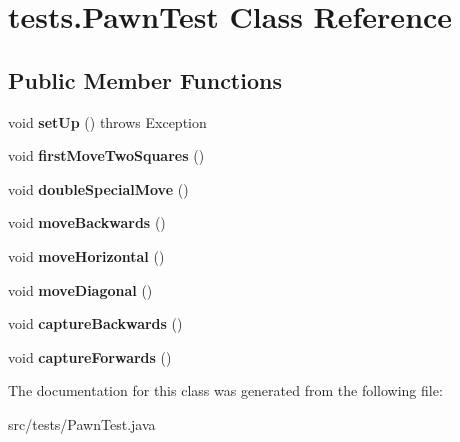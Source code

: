 \hypertarget{classtests_1_1_pawn_test}{\section{tests.\-Pawn\-Test Class Reference}
\label{classtests_1_1_pawn_test}
}
\subsection*{Public Member Functions}
\begin{DoxyCompactItemize}
\item 
\hypertarget{classtests_1_1_pawn_test_a1c95ca15c50c6d846a5ca577defdb7ab}{void {\bfseries set\-Up} ()  throws Exception }\label{classtests_1_1_pawn_test_a1c95ca15c50c6d846a5ca577defdb7ab}

\item 
\hypertarget{classtests_1_1_pawn_test_a9a099bfdaa7fc6661b0112efc5dca8a3}{void {\bfseries first\-Move\-Two\-Squares} ()}\label{classtests_1_1_pawn_test_a9a099bfdaa7fc6661b0112efc5dca8a3}

\item 
\hypertarget{classtests_1_1_pawn_test_a8e62a52928e629035f0deb8b412a7dc7}{void {\bfseries double\-Special\-Move} ()}\label{classtests_1_1_pawn_test_a8e62a52928e629035f0deb8b412a7dc7}

\item 
\hypertarget{classtests_1_1_pawn_test_a263f5b34b7171296138a813bac851aba}{void {\bfseries move\-Backwards} ()}\label{classtests_1_1_pawn_test_a263f5b34b7171296138a813bac851aba}

\item 
\hypertarget{classtests_1_1_pawn_test_a9cc7c43ddffb2354f8233c3b0d536551}{void {\bfseries move\-Horizontal} ()}\label{classtests_1_1_pawn_test_a9cc7c43ddffb2354f8233c3b0d536551}

\item 
\hypertarget{classtests_1_1_pawn_test_a77c5b54ebf6f8c9e7e0aecced443981f}{void {\bfseries move\-Diagonal} ()}\label{classtests_1_1_pawn_test_a77c5b54ebf6f8c9e7e0aecced443981f}

\item 
\hypertarget{classtests_1_1_pawn_test_a2b55d34f3ffc9091f1d62818e28b5042}{void {\bfseries capture\-Backwards} ()}\label{classtests_1_1_pawn_test_a2b55d34f3ffc9091f1d62818e28b5042}

\item 
\hypertarget{classtests_1_1_pawn_test_a6cfd93a32fd5a6479c6ac43c64ee5788}{void {\bfseries capture\-Forwards} ()}\label{classtests_1_1_pawn_test_a6cfd93a32fd5a6479c6ac43c64ee5788}

\end{DoxyCompactItemize}


The documentation for this class was generated from the following file\-:\begin{DoxyCompactItemize}
\item 
src/tests/Pawn\-Test.\-java\end{DoxyCompactItemize}
